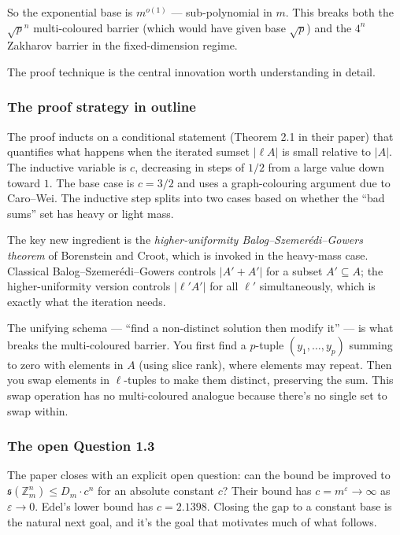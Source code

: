 \documentclass[11pt,a4paper]{article}
\theoremstyle{plain}
\theoremstyle{definition}
\theoremstyle{remark}
\newcommand{\Z}{\mathbb{Z}}
\newcommand{\sUFp}{\mathfrak{s}}
\begin{document}
So the exponential base is $m^{o(1)}$ --- sub-polynomial in $m$. This breaks both the $\sqrt{p}^n$ multi-coloured barrier (which would have given base $\sqrt{p}$) and the $4^n$ Zakharov barrier in the fixed-dimension regime.

The proof technique is the central innovation worth understanding in detail.

\subsubsection{The proof strategy in outline}

The proof inducts on a conditional statement (Theorem 2.1 in their paper) that quantifies what happens when the iterated sumset $|\ell A|$ is small relative to $|A|$. The inductive variable is $c$, decreasing in steps of $1/2$ from a large value down toward $1$. The base case is $c = 3/2$ and uses a graph-colouring argument due to Caro--Wei. The inductive step splits into two cases based on whether the ``bad sums'' set has heavy or light mass.

The key new ingredient is the \emph{higher-uniformity Balog--Szemer\'edi--Gowers theorem} of Borenstein and Croot, which is invoked in the heavy-mass case. Classical Balog--Szemer\'edi--Gowers controls $|A' + A'|$ for a subset $A' \subseteq A$; the higher-uniformity version controls $|\ell' A'|$ for all $\ell'$ simultaneously, which is exactly what the iteration needs.

The unifying schema --- ``find a non-distinct solution then modify it'' --- is what breaks the multi-coloured barrier. You first find a $p$-tuple $(y_1, \ldots, y_p)$ summing to zero with elements in $A$ (using slice rank), where elements may repeat. Then you swap elements in $\ell$-tuples to make them distinct, preserving the sum. This swap operation has no multi-coloured analogue because there's no single set to swap within.

\subsubsection{The open Question 1.3}

The paper closes with an explicit open question: can the bound be improved to $\sUFp(\Z_m^n) \leq D_m \cdot c^n$ for an absolute constant $c$? Their bound has $c = m^\varepsilon \to \infty$ as $\varepsilon \to 0$. Edel's lower bound has $c = 2.1398$. Closing the gap to a constant base is the natural next goal, and it's the goal that motivates much of what follows.
\end{document}
